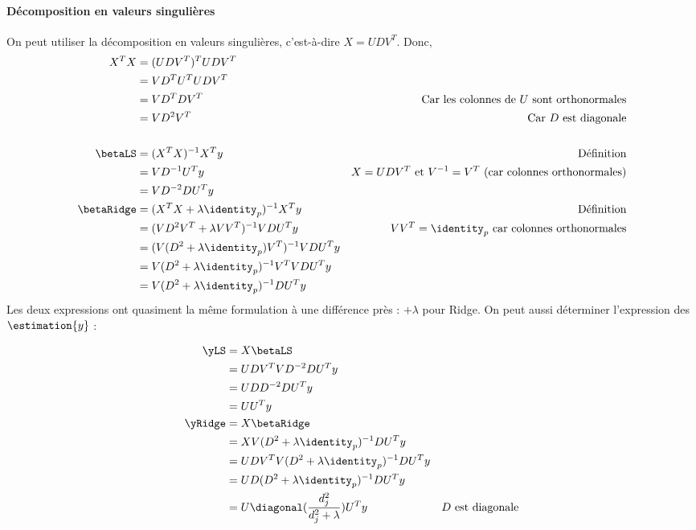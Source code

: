             \paragraph{Décomposition en valeurs singulières}
                On peut utiliser la décomposition en valeurs singulières, c'est-à-dire \(X = U D V^T\). Donc,
                \begin{align*}
                    X^T X &= (UDV^T)^T UDV^T\\
                    &= VD^TU^T UDV^T\\
                    &= VD^T DV^T & \text{Car les colonnes de \(U\) sont orthonormales}\\
                    &= V D^2 V^T & \text{Car \(D\) est diagonale}\\
                    \\
                    \betaLS &= (X^T X)^{-1} X^T y & \text{Définition}\\
                    &= V D^{-1} U^T y & X = U D V^T \text{ et \(V^{-1} = V^T\) (car colonnes orthonormales)}\\
                    &= V D^{-2} D U^T y\\
                    \betaRidge &= (X^T X + \lambda \identity_p)^{-1} X^T y & \text{Définition}\\
                    &= (V D^2 V^T + \lambda VV^T)^{-1} VDU^T y & VV^T = \identity_p \text{ car colonnes orthonormales}\\
                    &= (V(D^2 + \lambda \identity_p) V^T)^{-1} V D U^T y\\
                    &= V(D^2 + \lambda \identity_p)^{-1} V^T V D U^T y\\
                    &= V(D^2 + \lambda \identity_p)^{-1} D U^T y
                \end{align*}
                Les deux expressions ont quasiment la même formulation à une différence près : \(+ \lambda\) pour Ridge. On peut aussi déterminer l'expression des \(\estimation{y}\) :

                \begin{align*}
                    \yLS &= X \betaLS\\
                    &= U D V^T V D^{-2} D U^T y\\
                    &= U D D^{-2} D U^T y\\
                    &= U U^T y\\
                    \yRidge &= X\betaRidge\\
                    &= X V (D^2 + \lambda \identity_p)^{-1} D U^T y\\
                    &= U D V^T V (D^2 + \lambda \identity_p)^{-1} D U^T y\\
                    &= U D (D^2 + \lambda \identity_p)^{-1} D U^T y\\
                    &= U \diagonal(\frac{d_j^2}{d_j^2 + \lambda}) U^T y & \text{\(D\) est diagonale}
                \end{align*}

